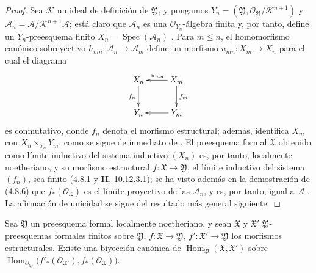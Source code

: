 \begin{proof}
Sea $\mathcal K$ un ideal de definición de $\mathfrak Y$, y pongamos
$Y_n=(\mathfrak Y,\mathcal O_{\mathfrak Y}/\mathcal K^{n+1})$ y
$\mathcal A_n=\mathcal A/\mathcal K^{n+1}\mathcal A$;
está claro que $\mathcal A_n$ es una $\mathcal O_{Y_n}$-álgebra finita y, por tanto,
define un $Y_n$-preesquema finito
$X_n=\operatorname{Spec}(\mathcal A_n)$
. Para $m\leq n$, el homomorfismo canónico
sobreyectivo
$h_{mn}:\mathcal A_n\to\mathcal A_m$
define un morfismo $u_{mn}:X_m\to X_n$ para el cual el diagrama
\[
\xymatrix{
X_n\ar[d]_{f_n} & X_m\ar[l]_{u_{mn}}\ar[d]^{f_m}\\
Y_n & Y_m\ar[l]
}
\]
es conmutativo, donde $f_n$ denota el morfismo estructural; además,
identifica $X_m$ con
$X_n\times_{Y_n}Y_m$, como se sigue de inmediato de
. El preesquema formal $\mathfrak X$ obtenido
como límite inductivo del sistema inductivo $(X_n)$ es, por tanto,
localmente noetheriano, y su morfismo estructural
$f:\mathfrak X\to\mathfrak Y$,
el límite inductivo del sistema $(f_n)$, sea finito (\hyperref[III.4.8.1-fr]{4.8.1} y \textbf{II}, 10.12.3.1); se ha visto además en la demostración de (\hyperref[III.4.8.6-fr]{4.8.6}) que $f_*(\mathcal O_{\mathfrak X})$ es el límite proyectivo de las
$\mathcal A_n$, y es, por tanto, igual a $\mathcal A$
. La afirmación de unicidad se sigue del
resultado más general siguiente.
\end{proof}

\begin{proposition}[4.8.8]
\label{III.4.8.8}
\label{III.4.8.8-fr}
Sea $\mathfrak Y$ un preesquema formal localmente noetheriano, y
sean $\mathfrak X$ y $\mathfrak X'$
$\mathfrak Y$-preesquemas formales finitos sobre $\mathfrak Y$, $f:\mathfrak X\to\mathfrak Y$,
$f':\mathfrak X'\to\mathfrak Y$ los morfismos estructurales. Existe una
biyección canónica de
$\operatorname{Hom}_{\mathfrak Y}(\mathfrak X,\mathfrak X')$
sobre
$\operatorname{Hom}_{\mathcal O_{\mathfrak Y}}
\bigl(f'_*(\mathcal O_{\mathfrak X'}),f_*(\mathcal O_{\mathfrak X})\bigr)$\footnotemark.
\end{proposition}

